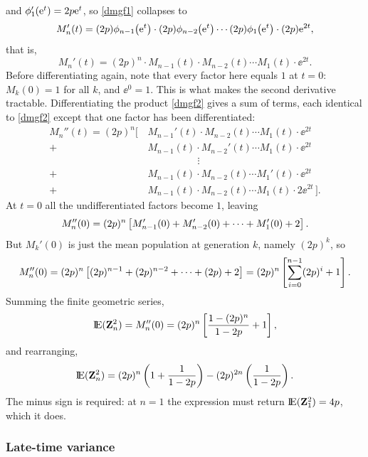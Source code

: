 and $\phi_1'\hspace{-2pt}\left({\rm e}^t\right) = 2p{\rm e}^t$, so \cref{dmgf1} collapses to
\begin{equation*}
M_n'(t) = (2p)\phi_{n-1}\hspace{-2pt}\left({\rm e}^t\right)\cdot(2p)\phi_{n-2}\hspace{-2pt}\left({\rm e}^t\right)\cdots(2p)\phi_{1}\hspace{-2pt}\left({\rm e}^t\right)\cdot(2p){\rm e}^{2t},
\end{equation*}
that is,
\begin{equation}
\label{dmgf2}
M_n'(t) = (2p)^n\cdot M_{n-1}(t)\cdot M_{n-2}(t)\cdots M_1(t)\cdot\ee^{2t}.
\end{equation}
Before differentiating again, note that every factor here equals $1$ at $t=0$:
$M_k(0)=1$ for all $k$, and $\ee^{0}=1$. This is what makes the second derivative
tractable. Differentiating the product \cref{dmgf2} gives a sum of terms, each identical
to \cref{dmgf2} except that one factor has been differentiated:
\begin{align*}
M_n''(t) = (2p)^n\bigg[\,&M_{n-1}'(t)\cdot M_{n-2}(t)\cdots M_1(t)\cdot\ee^{2t}\\
+ &M_{n-1}(t)\cdot M_{n-2}'(t)\cdots M_1(t)\cdot\ee^{2t}\\
&\hspace{60pt}\vdots\\
+ &M_{n-1}(t)\cdot M_{n-2}(t)\cdots M_1'(t)\cdot\ee^{2t}\\
+ &M_{n-1}(t)\cdot M_{n-2}(t)\cdots M_1(t)\cdot 2\ee^{2t}\,\bigg].
\end{align*}
At $t=0$ all the undifferentiated factors become $1$, leaving
\begin{equation*}
M_n''(0) = (2p)^n\left[ M_{n-1}'(0) + M_{n-2}'(0) + \cdots + M_1'(0) + 2\right].
\end{equation*}
But $M_k'(0)$ is just the mean population at generation $k$, namely $(2p)^k$, so
\begin{equation*}
M_n''(0) = (2p)^n\left[(2p)^{n-1} + (2p)^{n-2} + \cdots + (2p) + 2\right]
= (2p)^n\left[\sum_{i=0}^{n-1}(2p)^i + 1\right].
\end{equation*}
Summing the finite geometric series,
\begin{equation*}
{\rm I}\!{\rm E}({\bf Z}_n^2) = M_n''(0) = (2p)^n\left[\frac{1-(2p)^n}{1-2p} + 1\right],
\end{equation*}
and rearranging,
\begin{equation}
\label{secondMoment}
{\rm I}\!{\rm E}({\bf Z}_n^2) = (2p)^n\left(1 + \frac{1}{1-2p}\right) - (2p)^{2n}\left(\frac{1}{1-2p}\right).
\end{equation}
The minus sign is required: at $n=1$ the expression must return ${\rm I}\!{\rm E}({\bf Z}_1^2)=4p$,
which it does.

\subsubsection{Late-time variance}

